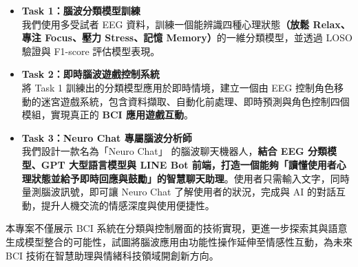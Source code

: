 \begin{itemize}
    \item \textbf{Task 1：腦波分類模型訓練} \\
    我們使用多受試者 EEG 資料，訓練一個能辨識四種心理狀態\textbf{（放鬆 Relax、專注 Focus、壓力 Stress、記憶 Memory）}的一維分類模型，並透過 LOSO 驗證與 F1-score 評估模型表現。

\item \textbf{Task 2：即時腦波遊戲控制系統} \\
將 Task 1 訓練出的分類模型應用於即時情境，建立一個由 EEG 控制角色移動的迷宮遊戲系統，包含資料擷取、自動化前處理、即時預測與角色控制四個模組，實現真正的\textbf{ BCI 應用遊戲互動}。

\item \textbf{Task 3：Neuro Chat 專屬腦波分析師} \\
我們設計一款名為「Neuro Chat」 的腦波聊天機器人，\textbf{結合 EEG 分類模型、GPT 大型語言模型與 LINE Bot 前端，打造一個能夠「讀懂使用者心理狀態並給予即時回應與鼓勵」的智慧聊天助理}。使用者只需輸入文字，同時量測腦波訊號，即可讓 Neuro Chat 了解使用者的狀況，完成與 AI 的對話互動，提升人機交流的情感深度與使用便捷性。
\end{itemize}

本專案不僅展示 BCI 系統在分類與控制層面的技術實現，更進一步探索其與語意生成模型整合的可能性，試圖將腦波應用由功能性操作延伸至情感性互動，為未來 BCI 技術在智慧助理與情緒科技領域開創新方向。
